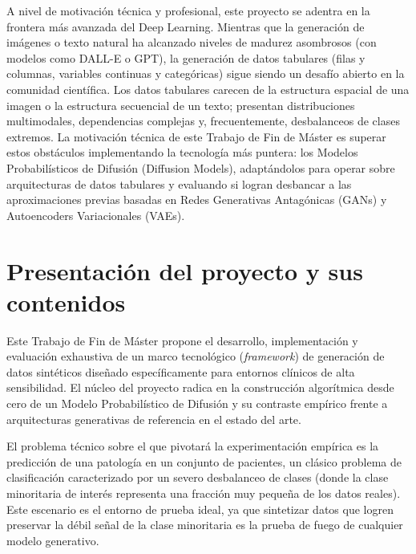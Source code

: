 A nivel de motivación técnica y profesional, este proyecto se adentra en la frontera más avanzada del Deep Learning. Mientras que la generación de imágenes o texto natural ha alcanzado niveles de madurez asombrosos (con modelos como DALL-E o GPT), la generación de datos tabulares (filas y columnas, variables continuas y categóricas) sigue siendo un desafío abierto en la comunidad científica. Los datos tabulares carecen de la estructura espacial de una imagen o la estructura secuencial de un texto; presentan distribuciones multimodales, dependencias complejas y, frecuentemente, desbalanceos de clases extremos. La motivación técnica de este Trabajo de Fin de Máster es superar estos obstáculos implementando la tecnología más puntera: los Modelos Probabilísticos de Difusión (Diffusion Models), adaptándolos para operar sobre arquitecturas de datos tabulares y evaluando si logran desbancar a las aproximaciones previas basadas en Redes Generativas Antagónicas (GANs) y Autoencoders Variacionales (VAEs).

\section{Presentación del proyecto y sus contenidos}

Este Trabajo de Fin de Máster propone el desarrollo, implementación y evaluación exhaustiva de un marco tecnológico (\textit{framework}) de generación de datos sintéticos diseñado específicamente para entornos clínicos de alta sensibilidad. El núcleo del proyecto radica en la construcción algorítmica desde cero de un Modelo Probabilístico de Difusión y su contraste empírico frente a arquitecturas generativas de referencia en el estado del arte.

El problema técnico sobre el que pivotará la experimentación empírica es la predicción de una patología en un conjunto de pacientes, un clásico problema de clasificación caracterizado por un severo desbalanceo de clases (donde la clase minoritaria de interés representa una fracción muy pequeña de los datos reales). Este escenario es el entorno de prueba ideal, ya que sintetizar datos que logren preservar la débil señal de la clase minoritaria es la prueba de fuego de cualquier modelo generativo.

